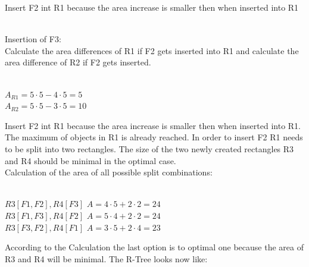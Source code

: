 \begin{enumerate}
  Insert F2 int R1 because the area increase is smaller then when inserted into R1\\\\
  \begin{center}
  \end{center}
  Insertion of F3:\\
  Calculate the area differences of R1 if F2 gets inserted into R1 and calculate the area difference of R2 if F2 gets inserted.\\\\
  \begin{center}
    $A_{R1} = 5 \cdot 5 - 4 \cdot 5 = 5$\\
    $A_{R2} = 5 \cdot 5 - 3 \cdot 5 = 10$
  \end{center}
  Insert F2 int R1 because the area increase is smaller then when inserted into R1. The maximum of objects in R1 is already reached. 
  In order to insert F2 R1 needs to be split into two rectangles. The size of the two newly created rectangles R3 and R4 should be minimal in the optimal case.\\
  Calculation of the area of all possible split combinations:\\\\
  \begin{center}
    $R3[F1, F2], R4[F3]$ $A = 4 \cdot 5 + 2 \cdot 2 = 24$\\
    $R3[F1, F3], R4[F2]$ $A = 5 \cdot 4 + 2 \cdot 2 = 24$\\
    $R3[F3, F2], R4[F1]$ $A = 3 \cdot 5 + 2 \cdot 4 = 23$
  \end{center}
    
    According to the Calculation the last option is to optimal one because the area of R3 and R4 will be minimal. The R-Tree looks now like:\\\\
    \begin{center}
    \end{center}
    

\end{enumerate}
